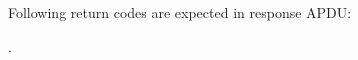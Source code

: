\documentclass[]{llncs}
\begin{document}
Following return codes are expected in response APDU:

.\begin{table}[!htbp]
\caption{Process data Return Code}
\label{process-data-res-apdu}
\end{table}


\end{document}
